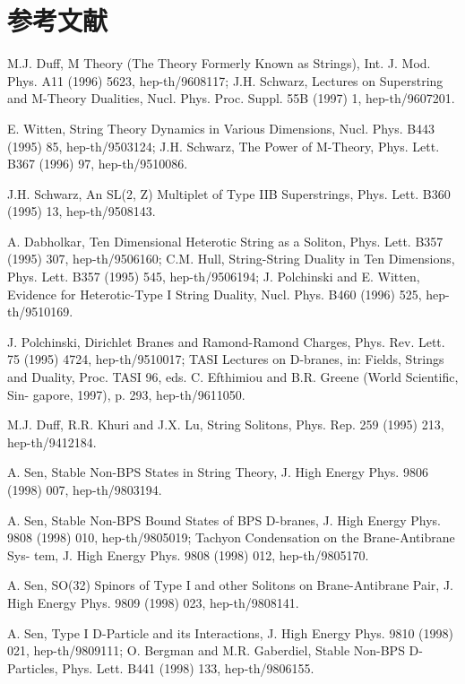 \documentclass[11pt,a4paper]{ctexart}
\begin{document}
\section*{参考文献}
\par\smallskip
\begin{enumerate}[label={[\arabic*]},leftmargin=*,itemsep=2pt]
\item M.J. Duff, M Theory (The Theory Formerly Known as Strings), Int. J. Mod. Phys. A11 (1996) 5623, hep-th/9608117; J.H. Schwarz, Lectures on Superstring and M-Theory Dualities, Nucl. Phys. Proc. Suppl. 55B (1997) 1, hep-th/9607201.
\item E. Witten, String Theory Dynamics in Various Dimensions, Nucl. Phys. B443 (1995) 85, hep-th/9503124; J.H. Schwarz, The Power of M-Theory, Phys. Lett. B367 (1996) 97, hep-th/9510086.
\item J.H. Schwarz, An SL(2, Z) Multiplet of Type IIB Superstrings, Phys. Lett. B360 (1995) 13, hep-th/9508143.
\item A. Dabholkar, Ten Dimensional Heterotic String as a Soliton, Phys. Lett. B357 (1995) 307, hep-th/9506160; C.M. Hull, String-String Duality in Ten Dimensions, Phys. Lett. B357 (1995) 545, hep-th/9506194; J. Polchinski and E. Witten, Evidence for Heterotic-Type I String Duality, Nucl. Phys. B460 (1996) 525, hep-th/9510169.
\item J. Polchinski, Dirichlet Branes and Ramond-Ramond Charges, Phys. Rev. Lett. 75 (1995) 4724, hep-th/9510017; TASI Lectures on D-branes, in: Fields, Strings and Duality, Proc. TASI 96, eds. C. Efthimiou and B.R. Greene (World Scientific, Sin- gapore, 1997), p. 293, hep-th/9611050.
\item M.J. Duff, R.R. Khuri and J.X. Lu, String Solitons, Phys. Rep. 259 (1995) 213, hep-th/9412184.
\item A. Sen, Stable Non-BPS States in String Theory, J. High Energy Phys. 9806 (1998) 007, hep-th/9803194.
\item A. Sen, Stable Non-BPS Bound States of BPS D-branes, J. High Energy Phys. 9808 (1998) 010, hep-th/9805019; Tachyon Condensation on the Brane-Antibrane Sys- tem, J. High Energy Phys. 9808 (1998) 012, hep-th/9805170.
\item A. Sen, SO(32) Spinors of Type I and other Solitons on Brane-Antibrane Pair, J. High Energy Phys. 9809 (1998) 023, hep-th/9808141.
\item A. Sen, Type I D-Particle and its Interactions, J. High Energy Phys. 9810 (1998) 021, hep-th/9809111; O. Bergman and M.R. Gaberdiel, Stable Non-BPS D-Particles, Phys. Lett. B441 (1998) 133, hep-th/9806155.

\end{enumerate}
\end{document}
